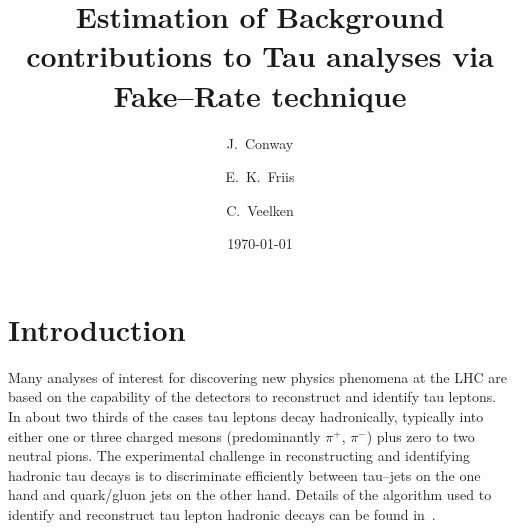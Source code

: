 

\newcommand{\tablesize}{\small}
\newcommand{\captiontext}{}


\title{Estimation of Background contributions to Tau analyses via Fake--Rate technique}

\address[ucdavis]{
 \\
  Department of Physics \\
  University of California \\ 
  One Shields Avenue \\
  Davis, CA 95616--8677
}

\author[ucdavis]{J.~Conway}
\author[ucdavis]{E.~K.~Friis}
\author[ucdavis]{C.~Veelken}

\date{\today}





\maketitle 

\section{Introduction}

Many analyses of interest for discovering new physics phenomena at the LHC are based on the capability 
of the detectors to reconstruct and identify tau leptons.
In about two thirds of the cases tau leptons decay hadronically,
typically into either one or three charged mesons (predominantly $\pi^{+}$,
$\pi^{-}$) plus zero to two neutral pions.
The experimental challenge in reconstructing and identifying hadronic tau decays
is to discriminate efficiently between tau--jets on the one hand and quark/gluon jets on the other hand.
Details of the algorithm used to identify and reconstruct tau lepton hadronic decays can be found in~\cite{PFlowTauReco}.

